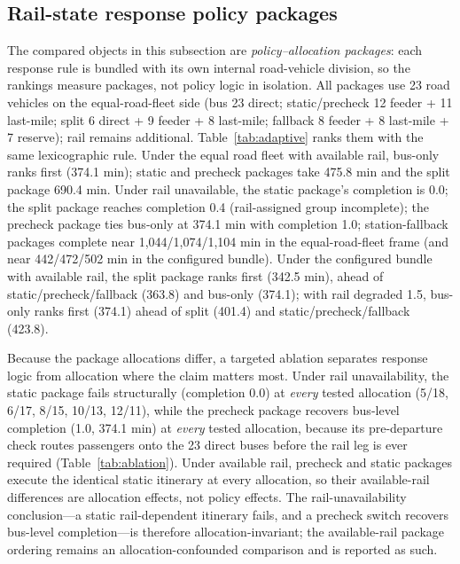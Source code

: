 \documentclass{ieeeaccess}
\begin{document}
\subsection{Rail-state response policy packages}
The compared objects in this subsection are \emph{policy--allocation packages}: each response rule is bundled with its own internal road-vehicle division, so the rankings measure packages, not policy logic in isolation. All packages use 23 road vehicles on the equal-road-fleet side (bus 23 direct; static/precheck 12 feeder + 11 last-mile; split 6 direct + 9 feeder + 8 last-mile; fallback 8 feeder + 8 last-mile + 7 reserve); rail remains additional. Table~\ref{tab:adaptive} ranks them with the same lexicographic rule. Under the equal road fleet with available rail, bus-only ranks first (374.1 min); static and precheck packages take 475.8 min and the split package 690.4 min. Under rail unavailable, the static package's completion is 0.0; the split package reaches completion 0.4 (rail-assigned group incomplete); the precheck package ties bus-only at 374.1 min with completion 1.0; station-fallback packages complete near 1{,}044/1{,}074/1{,}104 min in the equal-road-fleet frame (and near 442/472/502 min in the configured bundle). Under the configured bundle with available rail, the split package ranks first (342.5 min), ahead of static/precheck/fallback (363.8) and bus-only (374.1); with rail degraded 1.5, bus-only ranks first (374.1) ahead of split (401.4) and static/precheck/fallback (423.8).

Because the package allocations differ, a targeted ablation separates response logic from allocation where the claim matters most. Under rail unavailability, the static package fails structurally (completion 0.0) at \emph{every} tested allocation (5/18, 6/17, 8/15, 10/13, 12/11), while the precheck package recovers bus-level completion (1.0, 374.1 min) at \emph{every} tested allocation, because its pre-departure check routes passengers onto the 23 direct buses before the rail leg is ever required (Table~\ref{tab:ablation}). Under available rail, precheck and static packages execute the identical static itinerary at every allocation, so their available-rail differences are allocation effects, not policy effects. The rail-unavailability conclusion---a static rail-dependent itinerary fails, and a precheck switch recovers bus-level completion---is therefore allocation-invariant; the available-rail package ordering remains an allocation-confounded comparison and is reported as such.
\end{document}
